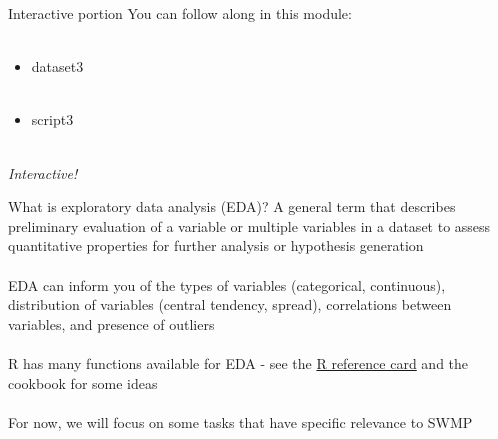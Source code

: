 \documentclass[xcolor=svgnames]{beamer}\usepackage[]{graphicx}\usepackage[]{color}
\begin{document}
\begin{frame}{Interactive portion}
You can follow along in this module: \\~\\
\begin{itemize}
\item dataset3 \\~\\
\item script3 \\~\\
\end{itemize}
\Large
\centerline{\emph{Interactive!}}
\end{frame}

\begin{frame}{What is exploratory data analysis (EDA)?}
A general term that describes preliminary evaluation of a variable or multiple variables in a dataset to assess quantitative properties for further analysis or hypothesis generation\\~\\
EDA can inform you of the \alert{types} of variables (categorical, continuous), \alert{distribution} of variables (central tendency, spread), \alert{correlations} between variables, and presence of \alert{outliers} \\~\\
R has many functions available for EDA - see the \href{http://cran.r-project.org/doc/contrib/Short-refcard.pdf}{R reference card} and the cookbook for some ideas\\~\\
For now, we will focus on some tasks that have specific relevance to SWMP
\end{frame}
\end{document}
